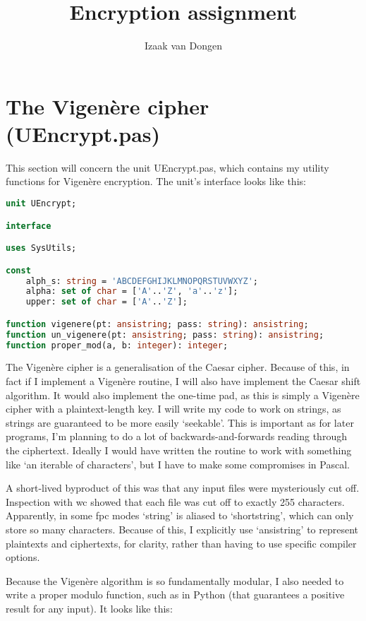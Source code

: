 \documentclass{article}
\title{Encryption assignment}
\author{Izaak van Dongen}
\begin{document}
    \maketitle
    \tableofcontents

    \section{The Vigen\`ere cipher (UEncrypt.pas)}
    This section will concern the unit UEncrypt.pas, which contains my utility
    functions for Vigen\`ere encryption. The unit's interface looks like this:

\begin{lstlisting}[language=Pascal, caption=UEncrypt interface]
unit UEncrypt;

interface

uses SysUtils;

const
    alph_s: string = 'ABCDEFGHIJKLMNOPQRSTUVWXYZ';
    alpha: set of char = ['A'..'Z', 'a'..'z'];
    upper: set of char = ['A'..'Z'];

function vigenere(pt: ansistring; pass: string): ansistring;
function un_vigenere(pt: ansistring; pass: string): ansistring;
function proper_mod(a, b: integer): integer;
\end{lstlisting}

    The Vigen\`ere cipher is a generalisation of the Caesar cipher. Because of
    this, in fact if I implement a Vigen\`ere routine, I will also have
    implement the Caesar shift algorithm. It would also implement the one-time
    pad, as this is simply a Vigen\`ere cipher with a plaintext-length key. I
    will write my code to work on strings, as strings are guaranteed to be more
    easily `seekable'. This is important as for later programs, I'm planning to
    do a lot of backwards-and-forwards reading through the ciphertext. Ideally
    I would have written the routine to work with something like `an iterable
    of characters', but I have to make some compromises in Pascal.

    A short-lived byproduct of this was that any input files were mysteriously
    cut off. Inspection with wc showed that each file was cut off to exactly
    255 characters. Apparently, in some fpc modes `string' is aliased to
    `shortstring', which can only store so many characters. Because of this, I
    explicitly use `ansistring' to represent plaintexts and ciphertexts, for
    clarity, rather than having to use specific compiler options.

    Because the Vigen\`ere algorithm is so fundamentally modular, I also needed
    to write a proper modulo function, such as in Python (that guarantees a
    positive result for any input). It looks like this:
\end{document}
